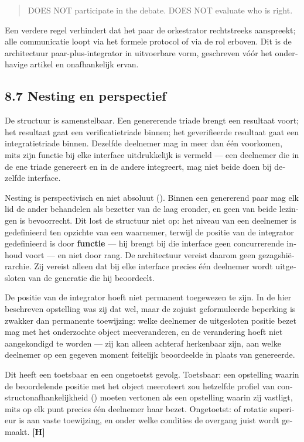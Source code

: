 \begin{dutch}
\begin{quote}
DOES NOT participate in the debate. DOES NOT evaluate who is right.
\end{quote}
Een verdere regel verhindert dat het paar de orkestrator rechtstreeks aanspreekt; alle communicatie loopt via het formele protocol of via de rol erboven. Dit is de architectuur paar-plus-integrator in uitvoerbare vorm, geschreven vóór het onderhavige artikel en onafhankelijk ervan.


\subsection*{8.7 Nesting en perspectief}
\label{sec:nl:8.7}

De structuur is samenstelbaar. Een genererende triade brengt een resultaat voort; het resultaat gaat een verificatietriade binnen; het geverifieerde resultaat gaat een integratietriade binnen. Dezelfde deelnemer mag in meer dan één voorkomen, mits zijn functie bij elke interface uitdrukkelijk is vermeld — een deelnemer die in de ene triade genereert en in de andere integreert, mag niet beide doen bij dezelfde interface.

Nesting is perspectivisch en niet absoluut (). Binnen een genererend paar mag elk lid de ander behandelen als bezetter van de laag eronder, en geen van beide lezingen is bevoorrecht. Dit lost de structuur niet op: het niveau van een deelnemer is gedefinieerd ten opzichte van een waarnemer, terwijl de positie van de integrator gedefinieerd is door \textbf{functie} — hij brengt bij die interface geen concurrerende inhoud voort — en niet door rang. De architectuur vereist daarom geen gezagshiërarchie. Zij vereist alleen dat bij elke interface precies één deelnemer wordt uitgesloten van de generatie die hij beoordeelt.

De positie van de integrator hoeft niet permanent toegewezen te zijn. In de hier beschreven opstelling was zij dat wel, maar de zojuist geformuleerde beperking is zwakker dan permanente toewijzing: welke deelnemer de uitgesloten positie bezet mag met het onderzochte object meeveranderen, en de verandering hoeft niet aangekondigd te worden — zij kan alleen achteraf herkenbaar zijn, aan welke deelnemer op een gegeven moment feitelijk beoordeelde in plaats van genereerde.

Dit heeft een toetsbaar en een ongetoetst gevolg. Toetsbaar: een opstelling waarin de beoordelende positie met het object meeroteert zou hetzelfde profiel van constructonafhankelijkheid () moeten vertonen als een opstelling waarin zij vastligt, mits op elk punt precies één deelnemer haar bezet. Ongetoetst: of rotatie superieur is aan vaste toewijzing, en onder welke condities de overgang juist wordt gemaakt. \textbf{[H]}



\end{dutch}
